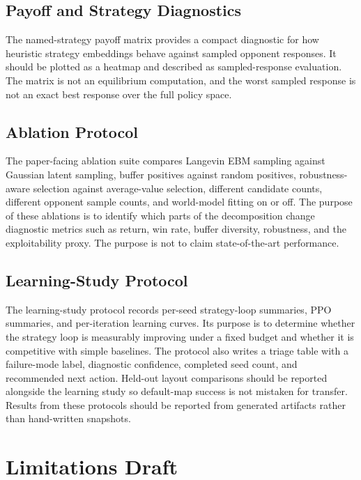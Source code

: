 \subsection{Payoff and Strategy Diagnostics}

The named-strategy payoff matrix provides a compact diagnostic for how heuristic strategy embeddings behave against sampled opponent responses.
It should be plotted as a heatmap and described as sampled-response evaluation.
The matrix is not an equilibrium computation, and the worst sampled response is not an exact best response over the full policy space.

\subsection{Ablation Protocol}

The paper-facing ablation suite compares Langevin EBM sampling against Gaussian latent sampling, buffer positives against random positives, robustness-aware selection against average-value selection, different candidate counts, different opponent sample counts, and world-model fitting on or off.
The purpose of these ablations is to identify which parts of the decomposition change diagnostic metrics such as return, win rate, buffer diversity, robustness, and the exploitability proxy.
The purpose is not to claim state-of-the-art performance.

\subsection{Learning-Study Protocol}

The learning-study protocol records per-seed strategy-loop summaries, PPO summaries, and per-iteration learning curves.
Its purpose is to determine whether the strategy loop is measurably improving under a fixed budget and whether it is competitive with simple baselines.
The protocol also writes a triage table with a failure-mode label, diagnostic confidence, completed seed count, and recommended next action.
Held-out layout comparisons should be reported alongside the learning study so default-map success is not mistaken for transfer.
Results from these protocols should be reported from generated artifacts rather than hand-written snapshots.

\section{Limitations Draft}

